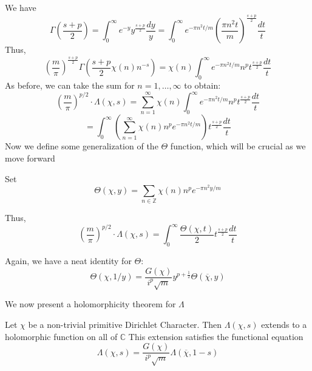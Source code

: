We have 
    \[
        \Gamma(\frac{s+p}{2})=\int_0^{\infty}e^{-y}y^{\frac{s+p}{2}}\frac{dy}{y}
        = \int_0^{\infty}e^{-\pi n^2t/m}(\frac{\pi n^2t}{m})^{\frac{s+p}{2}}\frac{dt}{t}
    \]
    Thus, 
    \[
        (\frac{m}{\pi})^{\frac{s+p}{2}}\Gamma(\frac{s+p}{2}\chi(n)n^{-s})
        =\chi(n)\int_0^{\infty}e^{-\pi n^2 t/m}n^pt^{\frac{s+p}{2}}\frac{dt}{t}
    \]  
    As before, we can take the sum for $n=1,\dots,\infty$ to obtain:
    \[
        (\frac{m}{\pi})^{p/2}\cdot\Lambda(\chi,s)=\sum_{n=1}^{\infty}\chi(n)\int_0^{\infty}e^{-\pi n^2 t/m}n^pt^{\frac{s+p}{2}}\frac{dt}{t}
    \]
    \[
        =\int_0^{\infty}(\sum_{n=1}^{\infty}\chi(n)n^pe^{-\pi n^2t/m})t^{\frac{s+p}{2}}\frac{dt}{t}  
    \]
    Now we define some generalization of the $\Theta$ function, which will be crucial as we move forward
    \begin{definition}
        Set 
        \[
            \Theta(\chi,y)=\sum_{n\in\mathbb{Z}}\chi(n)n^pe^{-\pi n^2y/m}  
        \]
    \end{definition}
    Thus, 
    \[
        (\frac{m}{\pi})^{p/2}\cdot\Lambda(\chi,s)=\int_0^{\infty}\frac{\Theta(\chi,t)}{2}t^{\frac{s+p}{2}}\frac{dt}{t}   
    \]
    \begin{theorem}
        Again, we have a neat identity for $\Theta$:
        \[
            \Theta(\chi,1/y)=\frac{G(\chi)}{i^p\sqrt{m}}y^{p+\frac{1}{2}}\Theta(\overline{\chi},y)
        \]
    \end{theorem}
    We now present a holomorphicity theorem for $\Lambda$
\begin{theorem}
    Let $\chi$ be a non-trivial primitive Dirichlet Character. Then 
    $\Lambda(\chi,s)$ extends to a holomorphic function on all of $\mathbb{C}$
    This extension satisfies the functional equation 
    \[
        \Lambda(\chi,s)=\frac{G(\chi)}{i^p\sqrt{m}}\Lambda(\overline{\chi},1-s)  
    \]
\end{theorem}

